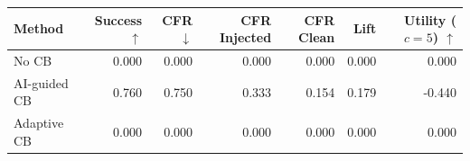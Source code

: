 \begin{tabular}{lrrrrrr}
\toprule
Method & Success $\uparrow$ & CFR $\downarrow$ & CFR Injected & CFR Clean & Lift & Utility ($c=5$) $\uparrow$ \\
\midrule
No CB & 0.000 & 0.000 & 0.000 & 0.000 & 0.000 & 0.000 \\
AI-guided CB & 0.760 & 0.750 & 0.333 & 0.154 & 0.179 & -0.440 \\
Adaptive CB & 0.000 & 0.000 & 0.000 & 0.000 & 0.000 & 0.000 \\
\bottomrule
\end{tabular}

